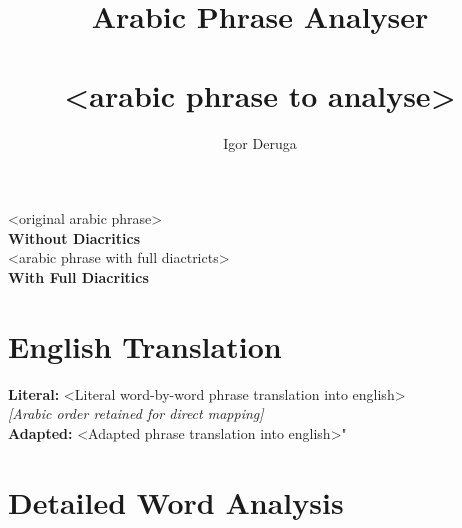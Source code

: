\documentclass[letter,12pt]{article}
\begin{document}
\title{\textbf{\Large Arabic Phrase Analyser}\\
\\
\normalsize \textarabic{<arabic phrase to analyse>}}
\author{Igor Deruga}
\date{}
\maketitle

\begin{tcolorbox}[colback=boxcolor,colframe=headercolor,title=\textbf{Arabic Phrase},breakable]
\centering
\textarabic{<original arabic phrase>}
\\[0.5em]
\textbf{Without Diacritics}
\\[1em]
\textarabic{<arabic phrase with full diactricts>}
\\[0.5em]
\textbf{With Full Diacritics}
\end{tcolorbox}

\section{English Translation}
\begin{tcolorbox}[colback=white,colframe=accentcolor,breakable]
\textbf{Literal:} <Literal word-by-word phrase translation into english> \\
\textit{[Arabic order retained for direct mapping]}\\[0.5em]
\textbf{Adapted:} <Adapted phrase translation into english>"
\end{tcolorbox}

\section{Detailed Word Analysis}
\end{document}
